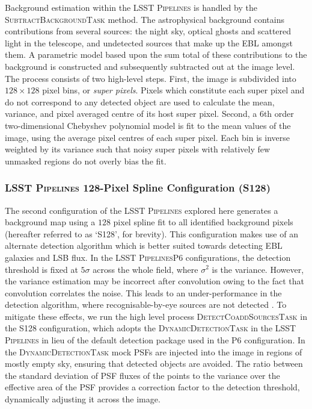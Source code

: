 \documentclass[fleqn,usenatbib,useAMS]{mnras}
\newcommand*{\LSSTPs}{\textsc{LSST Pipelines}\xspace}
\newcommand*{\DMA}{\textsc{P6}\xspace}
\newcommand*{\DMB}{\textsc{S128}\xspace}
\begin{document}
Background estimation within the \LSSTPs is handled by the \textsc{SubtractBackgroundTask} method. The astrophysical background contains contributions from several sources: the night sky, optical ghosts and scattered light in the telescope, and undetected sources that make up the EBL amongst them. A parametric model based upon the sum total of these contributions to the background is constructed and subsequently subtracted out at the image level. The process consists of two high-level steps. First, the image is subdivided into $128\times128$ pixel bins, or \textit{super pixels}. Pixels which constitute each super pixel and do not correspond to any detected object are used to calculate the mean, variance, and pixel averaged centre of its host super pixel. Second, a 6th order two-dimensional Chebyshev polynomial model is fit to the mean values of the image, using the average pixel centres of each super pixel. Each bin is inverse weighted by its variance such that noisy super pixels with relatively few unmasked regions do not overly bias the fit. 

\subsubsection{\LSSTPs 128-Pixel Spline Configuration (\DMB)}
\label{sec:dmstack2020}

The second configuration of the \LSSTPs explored here generates a background map using a $128$ pixel spline fit to all identified background pixels (hereafter referred to as `\DMB', for brevity). This configuration makes use of an alternate detection algorithm which is better suited towards detecting EBL galaxies and LSB flux. In the \LSSTPs \DMA configurations, the detection threshold is fixed at $5\sigma$ across the whole field, where $\sigma^2$ is the variance. However, the variance estimation may be incorrect after convolution owing to the fact that convolution correlates the noise. This leads to an under-performance in the detection algorithm, where recognisable-by-eye sources are not detected \citep[see][Figure 5]{Aihara2019}. To mitigate these effects, we run the high level process \textsc{DetectCoaddSourcesTask} in the \DMB configuration, which adopts the \textsc{DynamicDetectionTask} in the \LSSTPs in lieu of the default detection package used in the \DMA configuration. In the \textsc{DynamicDetectionTask} mock PSFs are injected into the image in regions of mostly empty sky, ensuring that detected objects are avoided. The ratio between the standard deviation of PSF fluxes of the points to the variance over the effective area of the PSF provides a correction factor to the detection threshold, dynamically adjusting it across the image. 
\end{document}
